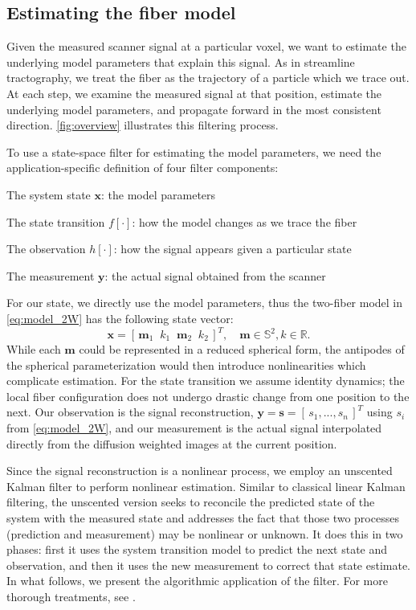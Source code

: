 \documentclass[letterpaper,hyperref,12pt]{gatech-thesis}
\renewcommand{\v}[1]{\ensuremath{\mathbf #1}\xspace}
\newcommand{\rv}[1]{\ensuremath{[\, #1 \,]}\xspace} %
\newcommand{\R}{\ensuremath{\mathbb R}}
\renewcommand{\S}{\ensuremath{\mathbb S}}
\newcommand{\s}{\v s}
\newcommand{\m}{\v m}
\newcommand{\x}{\v x}
\newcommand{\y}{\v y}
\begin{document}
\subsection{Estimating the fiber model} \label{sec:estimation}

Given the measured scanner signal at a particular voxel, we want to estimate
the underlying model parameters that explain this signal.  As in streamline
tractography, we treat the fiber as the trajectory of a particle which we
trace out.  At each step, we examine the measured signal at that position,
estimate the underlying model parameters, and propagate forward in the most
consistent direction.  \autoref{fig:overview} illustrates this filtering
process.

To use a state-space filter for estimating the model parameters, we need the
application-specific definition of four filter components:
\begin{enumerate*}
\item The system state \x: the model parameters
\item The state transition $f[\cdot]$: how the model changes as we trace the fiber
\item The observation $h[\cdot]$: how the signal appears given a particular state
\item The measurement \y: the actual signal obtained from the scanner
\end{enumerate*}
For our state, we directly use the model parameters, thus the two-fiber model
in \autoref{eq:model_2W} has the following state vector:
\begin{equation} \label{eq:state}
  \x = \rv{\m_1 \;\; k_1 \;\; \m_2 \;\; k_2 }^T,
  \quad
  \m \in \S^2, k \in \R .
\end{equation}
While each $\m$ could be represented in a reduced spherical form, the
antipodes of the spherical parameterization would then introduce
nonlinearities which complicate estimation.
%
For the state transition we assume identity dynamics; the local fiber
configuration does not undergo drastic change from one position to the next.
Our observation is the signal reconstruction, $\y=\s=\rv{s_1,...,s_n}^T$ using
$s_i$ from \autoref{eq:model_2W}, and our measurement is the actual signal
interpolated directly from the diffusion weighted images at the current
position.

Since the signal reconstruction is a nonlinear process, we employ an unscented
Kalman filter to perform nonlinear estimation.  Similar to classical linear
Kalman filtering, the unscented version seeks to reconcile the predicted state
of the system with the measured state and addresses the fact that those two
processes (prediction and measurement) may be nonlinear or unknown.  It does
this in two phases:  first it uses the system transition model to predict the
next state and observation, and then it uses the new measurement to correct
that state estimate.  In what follows, we present the algorithmic application
of the filter.  For more thorough treatments, see \cite{Julier2004,Merwe2003}.
\end{document}
